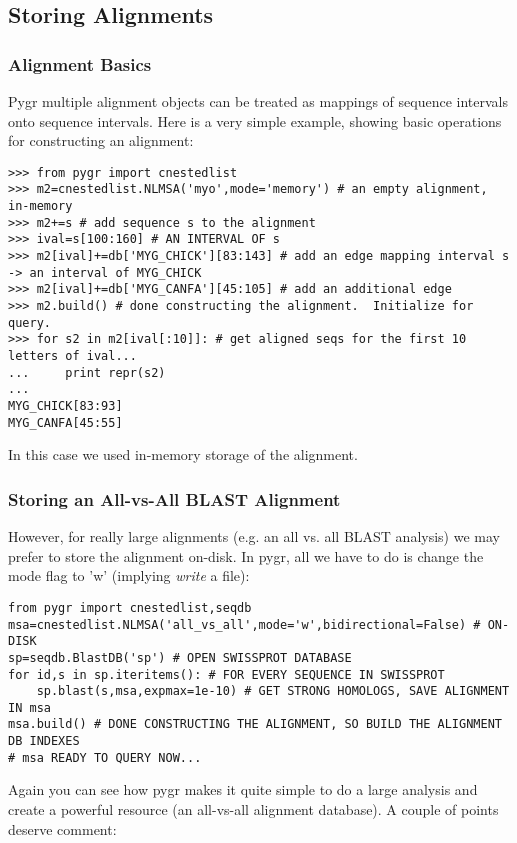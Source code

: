 \documentclass{howto}
\begin{document}
\subsection{Storing Alignments}
\subsubsection{Alignment Basics}

Pygr multiple alignment objects can be treated as mappings of sequence intervals onto sequence intervals.  Here is a very simple example, showing basic operations for constructing an alignment:

\begin{verbatim}
>>> from pygr import cnestedlist
>>> m2=cnestedlist.NLMSA('myo',mode='memory') # an empty alignment, in-memory
>>> m2+=s # add sequence s to the alignment
>>> ival=s[100:160] # AN INTERVAL OF s
>>> m2[ival]+=db['MYG_CHICK'][83:143] # add an edge mapping interval s -> an interval of MYG_CHICK
>>> m2[ival]+=db['MYG_CANFA'][45:105] # add an additional edge
>>> m2.build() # done constructing the alignment.  Initialize for query.
>>> for s2 in m2[ival[:10]]: # get aligned seqs for the first 10 letters of ival...
...     print repr(s2)
...
MYG_CHICK[83:93]
MYG_CANFA[45:55]
\end{verbatim}
In this case we used in-memory storage of the alignment.  

\subsubsection{Storing an All-vs-All BLAST Alignment}
However, for really large
alignments (e.g. an all vs. all BLAST analysis) we may prefer to store the alignment
on-disk.  In pygr, all we have to do is change the mode flag to 'w' (implying {\em write}
a file):
\begin{verbatim}
from pygr import cnestedlist,seqdb
msa=cnestedlist.NLMSA('all_vs_all',mode='w',bidirectional=False) # ON-DISK
sp=seqdb.BlastDB('sp') # OPEN SWISSPROT DATABASE
for id,s in sp.iteritems(): # FOR EVERY SEQUENCE IN SWISSPROT
    sp.blast(s,msa,expmax=1e-10) # GET STRONG HOMOLOGS, SAVE ALIGNMENT IN msa
msa.build() # DONE CONSTRUCTING THE ALIGNMENT, SO BUILD THE ALIGNMENT DB INDEXES
# msa READY TO QUERY NOW...
\end{verbatim}
Again you can see how pygr makes it quite simple to do a large analysis
and create a powerful resource (an all-vs-all alignment database).
A couple of points deserve comment:
\end{document}
